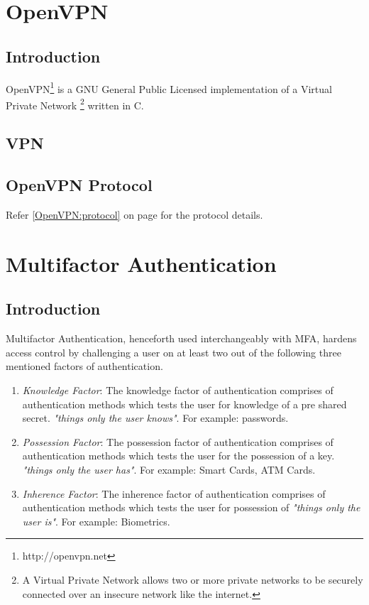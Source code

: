 \documentclass[11pt,oneside]{book}
\begin{document}
\mainmatter

\chapter{OpenVPN}
\section{Introduction}
OpenVPN\footnote{http://openvpn.net} is a GNU General Public Licensed implementation of a
Virtual Private Network \footnote{A Virtual Private Network allows two or more private
networks to be securely connected over an insecure network like the internet.} written
in C.

\section{VPN}

\section{OpenVPN Protocol}
Refer \ref{OpenVPN:protocol} on page \pageref{OpenVPN:protocol} for the protocol details.

\chapter{Multifactor Authentication}
\section{Introduction}
Multifactor Authentication, henceforth used interchangeably with MFA, hardens access control
by challenging a user on at least two out of the following three mentioned factors of
authentication.

\begin{enumerate}
    \item \emph{Knowledge Factor}: The knowledge factor of authentication comprises of
        authentication methods which tests the user for knowledge of a pre shared secret.
        \emph{"things only the user knows"}. For example: passwords.
    \item \emph{Possession Factor}: The possession factor of authentication comprises of
        authentication methods which tests the user for the possession of a key.
        \emph{"things only the user has"}. For example: Smart Cards, ATM Cards.
    \item \emph{Inherence Factor}: The inherence factor of authentication comprises of
        authentication methods which tests the user for possession of \emph{"things only
        the user is"}. For example: Biometrics.
\end{enumerate}
\end{document}
